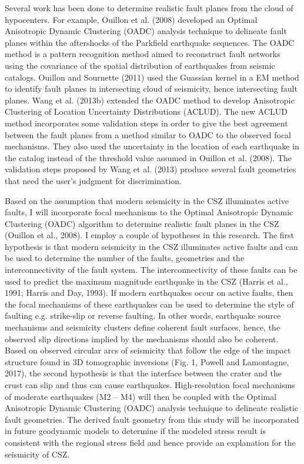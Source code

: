 \documentclass[draft]{agujournal2018}
\begin{document}
Several work has been done to determine realistic fault planes from the cloud of hypocenters. For example, Ouillon et al. (2008) developed an Optimal Anisotropic Dynamic Clustering (OADC) analysis technique  to delineate fault planes within the aftershocks of the Parkfield earthquake sequences. The OADC method is a pattern recognition method aimed to reconstruct fault networks using the covariance of the spatial distribution of earthquakes from seismic catalogs. Ouillon and Sournette (2011) used the Guassian kernel in a EM method to identify fault planes in intersecting cloud of seismicity, hence intersecting fault planes. Wang et al. (2013b) extended the OADC method to develop Anisotropic Clustering of Location Uncertainty Distributions (ACLUD). The new ACLUD method incorporates some validation steps in order to give the best agreement between the fault planes from a method similar to OADC to the observed focal mechanisms. They also used the uncertainty in the location of each earthquake in the catalog instead of the threshold value assumed in Ouillon et al. (2008). The validation steps proposed by Wang et al. (2013) produce several fault geometries that need the user’s judgment for discrimination.

Based on the assumption that modern seismicity in the CSZ illuminates active faults, I will incorporate focal mechanisms to the Optimal Anisotropic Dynamic Clustering (OADC) algorithm to determine realistic fault planes in the CSZ (Ouillon et al., 2008). I employ a couple of hypotheses in this research. The first hypothesis is that modern seismicity in the CSZ illuminates active faults and can be used to determine the number of the faults, geometries and the interconnectivity of the fault system. The interconnectivity of these faults can be used to predict the maximum magnitude earthquake in the CSZ (Harris et al., 1991; Harris and Day, 1993). If modern earthquakes occur on active faults, then the focal mechanisms of these earthquakes can be used to determine the style of faulting e.g. strike-slip or reverse faulting. In other words, earthquake source mechanisms and seismicity clusters define coherent fault surfaces, hence, the observed slip directions implied by the mechanisms should also be coherent. Based on observed circular arcs of seismicity that follow the edge of the impact structure found in 3D tomographic inversions (Fig. 1, Powell and Lamontagne, 2017), the second hypothesis is that the interface between the crater and the crust can slip and thus can cause earthquakes. High-resolution focal mechanisms of moderate earthquakes (M2 – M4) will then be coupled with the Optimal Anisotropic Dynamic Clustering (OADC) analysis technique to delineate realistic fault geometries. The derived fault geometry from this study will be incorporated in future geodynamic models to determine if the modeled stress result is consistent with the regional stress field and hence provide an explanation for the seismicity of CSZ.
\end{document}
